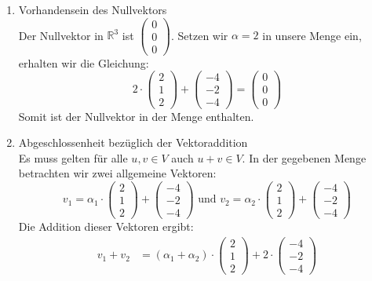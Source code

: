 \documentclass[a4paper]{scrartcl}
\begin{document}
\begin{enumerate}[label=\alph*)]
\begin{enumerate}[label=\alph*)]
  \item Vorhandensein des Nullvektors\\
  Der Nullvektor in \(\mathbb{R}^3\) ist \(\begin{pmatrix} 0 \\ 0 \\ 0 \end{pmatrix}\). Setzen wir $\alpha = 2$ in unsere Menge ein, erhalten wir die Gleichung:
  \[
  2 \cdot \begin{pmatrix} 2 \\ 1 \\ 2 \end{pmatrix} + \begin{pmatrix} -4 \\ -2 \\ -4 \end{pmatrix} = \begin{pmatrix} 0 \\ 0 \\ 0 \end{pmatrix}
  \]
  Somit ist der Nullvektor in der Menge enthalten.
  \item Abgeschlossenheit bezüglich der Vektoraddition\\
  Es muss gelten für alle $u, v \in V$ auch $u + v \in V$. 
  In der gegebenen Menge betrachten wir zwei allgemeine Vektoren:
  \[
    v_1 = \alpha_1 \cdot \begin{pmatrix} 2 \\ 1 \\ 2 \end{pmatrix} + \begin{pmatrix} -4 \\ -2 \\ -4 \end{pmatrix}
    \text{ und }
    v_2 = \alpha_2 \cdot \begin{pmatrix} 2 \\ 1 \\ 2 \end{pmatrix} + \begin{pmatrix} -4 \\ -2 \\ -4 \end{pmatrix}
  \]
  Die Addition dieser Vektoren ergibt:
  \begin{align*}
    v_1 + v_2 &= (\alpha_1 + \alpha_2) \cdot \begin{pmatrix} 2 \\ 1 \\ 2 \end{pmatrix} + 2 \cdot \begin{pmatrix} -4 \\ -2 \\ -4 \end{pmatrix} \\

\end{align*}
\end{enumerate}
\end{enumerate}
\end{document}
